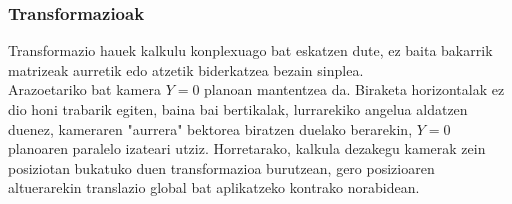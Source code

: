 \documentclass[12pt]{article}
\begin{document}
\subsubsection{Transformazioak}

Transformazio hauek kalkulu konplexuago bat eskatzen dute, ez baita bakarrik matrizeak aurretik edo atzetik biderkatzea bezain sinplea.\\
Arazoetariko bat kamera $Y=0$ planoan mantentzea da. Biraketa horizontalak ez dio honi trabarik egiten, baina bai bertikalak, lurrarekiko angelua aldatzen duenez, kameraren "aurrera" bektorea  biratzen duelako berarekin, $Y=0$ planoaren paralelo izateari utziz. Horretarako, kalkula dezakegu kamerak zein posiziotan bukatuko duen transformazioa burutzean, gero posizioaren altuerarekin translazio global bat aplikatzeko kontrako norabidean.
\end{document}
